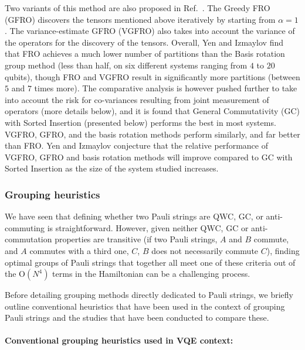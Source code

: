 Two variants of this method are also proposed in Ref.~\cite{Yen2021_Cartan}. The Greedy FRO (GFRO) discovers the tensors mentioned above iteratively by starting from $\alpha=1$. The variance-estimate GFRO (VGFRO) also takes into account the variance of the operators for the discovery of the tensors. Overall, Yen and Izmaylov find that FRO achieves a much lower number of partitions than the Basis rotation group method \cite{Huggins2021} (less than half, on six different systems ranging from $4$ to $20$ qubits), though FRO and VGFRO result in significantly more partitions (between $5$ and $7$ times more). The comparative analysis is however pushed further to take into account the risk for co-variances resulting from joint measurement of operators \cite{mccleanTheoryVariationalHybrid2015} (more details below), and it is found \cite{Yen2021_Cartan} that General Commutativity (GC) with Sorted Insertion \cite{Crawford2021} (presented below) performs the best in most systems. VGFRO, GFRO, and the basis rotation methods perform similarly, and far better than FRO. Yen and Izmaylov \cite{Yen2021_Cartan} conjecture that the relative performance of VGFRO, GFRO and basis rotation methods will improve compared to GC with Sorted Insertion as the size of the system studied increases. 

\subsubsection{Grouping heuristics} \label{sec:grouping_heuristics}

We have seen that defining whether two Pauli strings are QWC, GC, or anti-commuting is straightforward. However, given neither QWC, GC or anti-commutation properties are transitive (if two Pauli strings, $A$ and $B$ commute, and $A$ commutes with a third one, $C$, $B$ does not necessarily commute $C$), finding optimal groups of Pauli strings that together all meet one of these criteria out of the $\mathrm{O}(N^4)$ terms in the Hamiltonian can be a challenging process. 

Before detailing grouping methods directly dedicated to Pauli strings, we briefly outline conventional heuristics that have been used in the context of grouping Pauli strings and the studies that have been conducted to compare these. 

\paragraph{Conventional grouping heuristics used in VQE context:}

